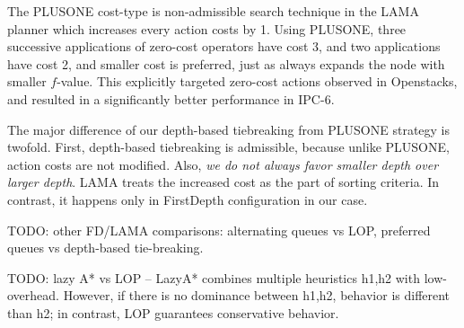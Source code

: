 The PLUSONE cost-type is  non-admissible search technique in the LAMA planner \cite{richter2010lama}
which increases every action costs by 1.
Using PLUSONE, three successive
applications of zero-cost operators have cost 3, and two
applications have cost 2, and smaller cost is preferred, just as
\astar always expands the node with smaller $f$-value.
This explicitly targeted zero-cost actions observed in Openstacks,
and resulted in a significantly better performance in IPC-6.

The major difference of our depth-based tiebreaking from PLUSONE
strategy is twofold.  First, depth-based tiebreaking is admissible, because 
unlike PLUSONE, action costs are not modified.
Also, \emph{we do not always favor smaller depth over
larger depth}. LAMA treats the increased cost as the part of
sorting criteria. In contrast, it happens only in FirstDepth configuration in our case.

TODO: other FD/LAMA comparisons: alternating queues vs LOP,   preferred queues vs depth-based tie-breaking.


TODO:  lazy A* vs LOP -- LazyA* combines multiple heuristics h1,h2 with low-overhead. However, if there is no dominance between h1,h2, behavior is different than h2; in contrast, LOP guarantees conservative behavior.

